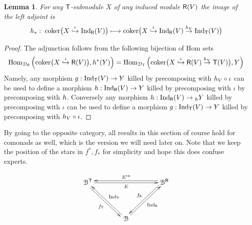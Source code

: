 \documentclass[a4paper, reqno]{amsart}
\newtheorem{lemma}[theorem]{Lemma}
\theoremstyle{introTheorems}
\newcommand{\coker}{\textup{coker}}
\newcommand\Hom{\textup{Hom}}
\renewcommand{\1}{\mathbbold{1}}
\begin{document}
\begin{lemma}\label{lm_monadExtensionOnRdurchX}
For any ${\mathsf{T}}$-submodule $X$ of any induced module ${\mathsf{R}}(V)$ the image of the left adjoint is 
$$\fpullback_*:\; \coker\big(X\stackrel{\iota}{\hookrightarrow}\funR(V)\big)
\longmapsto \coker\big(X\stackrel{\iota}{\hookrightarrow}\funR(V)\stackrel{\fpullback_V}{\rightarrow}\funT(V)\big)
$$
\end{lemma}
\begin{proof}
The adjunction follows from the following bijection of Hom sets
$$\Hom_{\catD_\monR}\left(\coker\big(X\stackrel{\iota}{\hookrightarrow}\monR(V)\big),\fpullback^*(Y)\right)
=
\Hom_{\catD_\monT}\left(\coker\big(X\stackrel{\iota}{\hookrightarrow}\monR(V)\stackrel{\fpullback_V}{\rightarrow}\monT(V)\big),Y\right)
$$
Namely, any morphism $g:\textup{Ind}_{\mathsf{T}}(V)\to Y$ killed by precomposing with $h_V\circ \iota$ can be used to define a morphism $h:\textup{Ind}_{{\mathsf{R}}}(V)\to Y$ killed by precomposing with $\iota$ by precomposing with $h$. Conversely any morphism $h:\textup{Ind}_{{\mathsf{R}}}(V)\to {_h}Y$ killed by precomposing with $\iota$ can be used to define a morphism $g:\textup{Ind}_{\mathsf{T}}(V)\to Y$ killed by precomposing with $h_V\circ \iota$.
\end{proof}

By going to the opposite category, all results in this section of course hold for comonads as well, which is the version we will need later on. Note that we keep the position of the stars in $f^*,f_*$ for simplicity and hope this does confuse experts.


\begin{equation}\label{formula_comonadTriangleSituation}
\xymatrix@C=4em@R=4em{
\cat^{\monT} 
\ar[rr]_{\funE}
\ar@<-3pt>[rd]_{\forget_\monT}
&&
\cat^{\monR}
\ar@<-3pt>[ll]_{\funE^\ra}
\ar@<-3pt>[ld]_{\forget_\monR}
\\
&
\catB
\ar[lu]_{\funT}
\ar[ru]_{\funR}
&
\\
} 
\end{equation}
\end{document}
